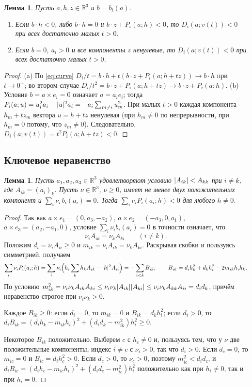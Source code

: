 \documentclass[11pt]{article}
\newtheorem{lemma}[theorem]{Лемма}
\theoremstyle{definition}
\theoremstyle{remark}
\newcommand{\R}{\mathbb{R}}
\DeclarePairedDelimiter{\abs}{\lvert}{\rvert}
\begin{document}
\begin{lemma}\label{lem:order}
Пусть $a,h,z\in\R^3$ и $b=b_i(a)$.
\begin{enumerate}
\item[(a)] Если $b\cdot h<0$, либо $b\cdot h=0$ и $b\cdot z+P_i(a;h)<0$, то $D_i(a;v(t))<0$ при
всех достаточно малых $t>0$.
\item[(b)] Если $b=0$, $a_i>0$ и все компоненты $z$ ненулевые, то $D_i(a;v(t))<0$ при всех
достаточно малых $t>0$.
\end{enumerate}
\end{lemma}
\begin{proof}
(a) По \eqref{eq:curve} $D_i/t=b\cdot h+t(b\cdot z+P_i(a;h+tz))\to b\cdot h$ при $t\to0^+$; во втором
случае $D_i/t^2=b\cdot z+P_i(a;h+tz)\to b\cdot z+P_i(a;h)$.
(b) Условие $b=a\times e_i=0$ означает $a=a_ie_i$; тогда
$P_i(a;u)=u_i^2a_i-\abs{u}^2a_i=-a_i\sum_{m\ne i}u_m^2$. При малых $t>0$ каждая компонента
$h_m+tz_m$ вектора $u=h+tz$ ненулевая (при $h_m\ne0$ по непрерывности, при $h_m=0$ потому, что
$z_m\ne0$). Следовательно, $D_i(a;v(t))=t^2P_i(a;h+tz)<0$.
\end{proof}

\subsection{Ключевое неравенство}

\begin{lemma}\label{lem:key}
Пусть $a_1,a_2,a_3\in\R^3$ удовлетворяют условию $\abs{A_{ik}}<A_{kk}$ при $i\ne k$, где
$A_{ik}=(a_i)_k$. Пусть $\nu\in\R^3$, $\nu\ge0$, имеет не менее двух положительных компонент и
$\sum_i\nu_i\,b_i(a_i)=0$. Тогда $\sum_i\nu_iP_i(a_i;h)<0$ для любого $h\ne0$.
\end{lemma}

\begin{proof}
Так как $a\times e_1=(0,a_3,-a_2)$, $a\times e_2=(-a_3,0,a_1)$, $a\times e_3=(a_2,-a_1,0)$, условие
$\sum_i\nu_ib_i(a_i)=0$ в точности означает, что
\[
\nu_iA_{ik}=\nu_kA_{ki}\qquad(i\ne k).
\]
Положим $d_i=\nu_iA_{ii}\ge0$ и $m_{ik}=\nu_iA_{ik}=\nu_kA_{ki}$. Раскрывая скобки и пользуясь
симметрией, получаем
\[
\sum_i\nu_iP_i(a_i;h)=\sum_i\nu_i\Bigl(h_i\sum_kh_kA_{ik}-\abs{h}^2A_{ii}\Bigr)=-\sum_{i<k}B_{ik},
\qquad B_{ik}=d_ih_k^2+d_kh_i^2-2m_{ik}h_ih_k .
\]
По условию
$m_{ik}^2=\nu_i\nu_kA_{ik}A_{ki}\le\nu_i\nu_k\abs{A_{ik}}\abs{A_{ki}}\le\nu_i\nu_kA_{kk}A_{ii}=d_id_k$,
причём неравенство строгое при $\nu_i\nu_k>0$.

Каждое $B_{ik}\ge0$: если $d_i=0$, то $m_{ik}=0$ и $B_{ik}=d_kh_i^2$; если $d_i>0$, то
$d_iB_{ik}=(d_ih_k-m_{ik}h_i)^2+(d_id_k-m_{ik}^2)h_i^2\ge0$.

Некоторое $B_{ik}$ положительно. Выберем $c$ с $h_c\ne0$ и, пользуясь тем, что у $\nu$ две
положительные компоненты, индекс $i\ne c$ с $\nu_i>0$, так что $d_i>0$. Если $d_c=0$, то
$m_{ic}=0$ и $B_{ic}=d_ih_c^2>0$. Если $d_c>0$, то $\nu_c>0$, поэтому $m_{ic}^2<d_id_c$, и
$d_iB_{ic}=(d_ih_c-m_{ic}h_i)^2+(d_id_c-m_{ic}^2)h_i^2$ положительно как при $h_i\ne0$, так и
при $h_i=0$.
\end{proof}
\end{document}
